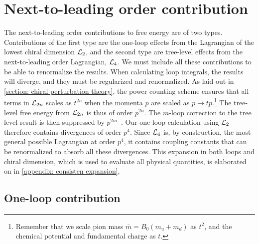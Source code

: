 \section{Next-to-leading order contribution}


The next-to-leading order contributions to free energy are of two types.
Contributions of the first type are the one-loop effects from the Lagrangian of the lowest chiral dimension $\mathcal{L}_2$, and the second type are tree-level effects from the next-to-leading order Lagrangian, $\mathcal{L}_4$.
We must include all these contributions to be able to renormalize the results.
When calculating loop integrals, the results will diverge, and they must be regularized and renormalized.
As laid out in \autoref{section: chiral perturbation theory}, the power counting scheme ensures that all terms in $\mathcal{L}_{2n}$ scales as $t^{2n}$ when the momenta $p$ are scaled as  $p \rightarrow t p$.\footnote{
    Remember that we scale pion mass $\bar m = B_0(m_u + m_d)$ as $t^2$, and the chemical potential and fundamental charge as $t$.
    }
The tree-level free energy from $\mathcal{L}_{2n}$ is thus of order $p^{2n}$.
The $m$-loop correction to the tree level result is then suppressed by $p^{2m}$~\autocite{gasserChiralPerturbationTheory1984,weinbergPhenomenologicalLagrangians1979}.
Our one-loop calculation using $\mathcal{L}_2$ therefore contains divergences of order $p^{4}$. 
Since $\mathcal{L}_4$ is, by construction, the most general possible Lagrangian at order $p^4$, it contains coupling constants that can be renormalized to absorb all these divergences.
This expansion in both loops and chiral dimension, which is used to evaluate all physical quantities, is elaborated on in \autoref{appendix: consisten expansion},


\subsection{One-loop contribution}

